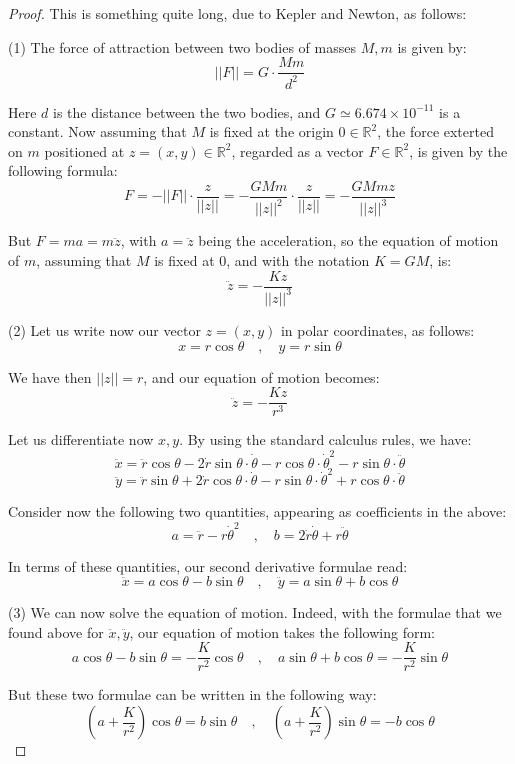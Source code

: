 \documentclass[12pt]{amsbook}
\begin{document}
\begin{proof}
This is something quite long, due to Kepler and Newton, as follows:

\medskip

(1) The force of attraction between two bodies of masses $M,m$ is given by:
$$||F||=G\cdot\frac{Mm}{d^2}$$

Here $d$ is the distance between the two bodies, and $G\simeq 6.674\times 10^{-11}$ is a constant. Now assuming that $M$ is fixed at the origin $0\in\mathbb R^2$, the force exterted on $m$ positioned at $z=(x,y)\in\mathbb R^2$, regarded as a vector $F\in\mathbb R^2$, is given by the following formula:
$$F
=-||F||\cdot\frac{z}{||z||}
=-\frac{GMm}{||z||^2}\cdot\frac{z}{||z||}
=-\frac{GMmz}{||z||^3}$$

But $F=ma=m\ddot{z}$, with $a=\ddot{z}$ being the acceleration, so the equation of motion of $m$, assuming that $M$ is fixed at $0$, and with the notation $K=GM$, is:
$$\ddot{z}=-\frac{Kz}{||z||^3}$$

(2) Let us write now our vector $z=(x,y)$ in polar coordinates, as follows:
$$x=r\cos\theta\quad,\quad 
y=r\sin\theta$$

We have then $||z||=r$, and our equation of motion becomes:
$$\ddot{z}=-\frac{Kz}{r^3}$$

Let us differentiate now $x,y$. By using the standard calculus rules, we have:
$$\ddot{x}=\ddot{r}\cos\theta-2\dot{r}\sin\theta\cdot\dot{\theta}-r\cos\theta\cdot\dot{\theta}^2-r\sin\theta\cdot\ddot\theta$$
$$\ddot{y}=\ddot{r}\sin\theta+2\dot{r}\cos\theta\cdot\dot{\theta}-r\sin\theta\cdot\dot{\theta}^2+r\cos\theta\cdot\ddot\theta$$

Consider now the following two quantities, appearing as coefficients in the above:
$$a=\ddot{r}-r\dot{\theta}^2\quad,\quad b=2\dot{r}\dot{\theta}+r\ddot{\theta}$$

In terms of these quantities, our second derivative formulae read:
$$\ddot{x}=a\cos\theta-b\sin\theta\quad,\quad 
\ddot{y}=a\sin\theta+b\cos\theta$$

(3) We can now solve the equation of motion. Indeed, with the formulae that we found above for $\ddot{x},\ddot{y}$, our equation of motion takes the following form:
$$a\cos\theta-b\sin\theta=-\frac{K}{r^2}\cos\theta\quad,\quad
a\sin\theta+b\cos\theta=-\frac{K}{r^2}\sin\theta$$

But these two formulae can be written in the following way:
$$\left(a+\frac{K}{r^2}\right)\cos\theta=b\sin\theta\quad,\quad 
\left(a+\frac{K}{r^2}\right)\sin\theta=-b\cos\theta$$


\end{proof}
\end{document}
